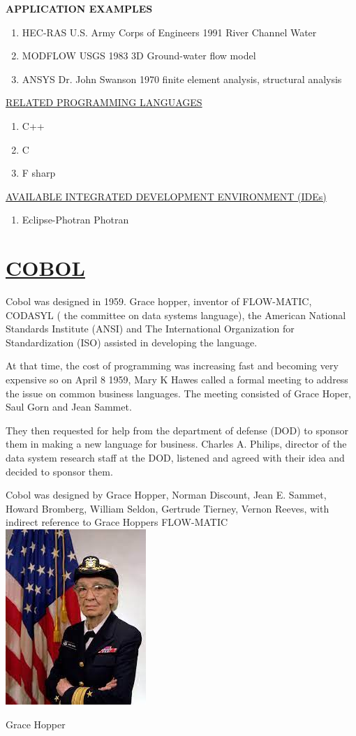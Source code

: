 \documentclass{article}
\begin{document}
\newpage
\textbf{APPLICATION EXAMPLES}
\begin{enumerate}
	\item HEC-RAS U.S. Army Corps of Engineers 1991 River Channel Water\\
	\item MODFLOW USGS 1983 3D Ground-water flow model\\
	\item ANSYS Dr. John Swanson 1970 finite element analysis, structural
	analysis\\
\end{enumerate}

\newpage
\underline{RELATED PROGRAMMING LANGUAGES}
\begin{enumerate}
	\item C++
	\item C
	\item F sharp
\end{enumerate}

\underline{AVAILABLE INTEGRATED DEVELOPMENT ENVIRONMENT (IDEs)}
\begin{enumerate}
\item Eclipse-Photran Photran
\end{enumerate}

\newpage
\section{\underline{COBOL}}
Cobol was designed in 1959. Grace hopper, inventor of FLOW-MATIC, CODASYL ( the committee on data systems language), the American National Standards Institute (ANSI) and The International Organization for Standardization (ISO) assisted in developing the language.

At that time, the cost of programming was increasing fast and becoming very expensive so on April 8 1959, Mary K Hawes called a formal meeting to address the issue on common business languages. The meeting consisted of Grace Hoper, Saul Gorn and Jean Sammet.

They then requested for help from the department of defense (DOD) to sponsor  them in making a new language for business. Charles A. Philips, director of the data system research staff at the DOD, listened and agreed with their idea and decided to sponsor them.

Cobol was designed by Grace Hopper, Norman Discount, Jean E. Sammet, Howard Bromberg, William Seldon, Gertrude Tierney, Vernon Reeves,  with indirect reference to Grace Hoppers FLOW-MATIC\\
\newpage
\includegraphics{grace hopper.jpg}
\caption{Grace Hopper}
\end{document}
